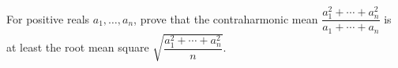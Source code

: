 For positive reals $a_1,\dots,a_n$, prove that the contraharmonic mean $\dfrac{a_1^2+\cdots+a_n^2}{a_1+\cdots+a_n}$ is at least the root mean square $\sqrt{\dfrac{a_1^2+\cdots+a_n^2}n}$.
